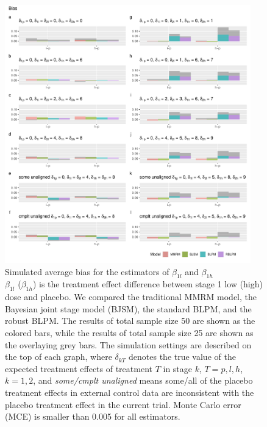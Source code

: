 \begin{figure}
\includegraphics[width=0.95\textwidth]{chapters/figures/Bias_longitudinal.pdf}
\caption{Simulated average bias for the estimators of $\beta_{1l}$ and $\beta_{1h}$\\$\beta_{1l}$ ($\beta_{1h}$) is the treatment effect difference between stage 1 low (high) dose and placebo. We compared the traditional MMRM model, the Bayesian joint stage model (BJSM), the standard BLPM, and the robust BLPM. The results of total sample size 50 are shown as the colored bars, while the results of total sample size 25 are shown as the overlaying grey bars. The simulation settings are described on the top of each graph, where $\delta_{kT}$ denotes the true value of the expected treatment effects of treatment $T$ in stage $k$, $T = p, l, h$, $k = 1, 2$, and \emph{some/cmplt unaligned} means some/all of the placebo treatment effects in external control data are inconsistent with the placebo treatment effect in the current trial. Monte Carlo error (MCE) is smaller than 0.005 for all estimators.}
\label{fig:Bias_longitudinal}
\end{figure}


